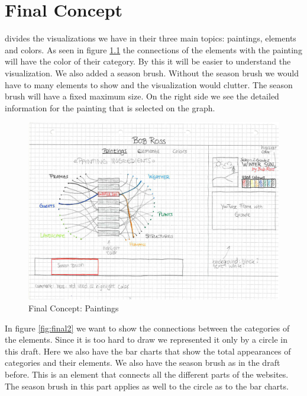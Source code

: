 \documentclass[a4paper]{tufte-book}
\begin{document}
\chapter{Final Concept}

 divides the visualizations we have in their three main topics: paintings, elements and colors. As seen in figure \ref{fig:final1} the connections of the elements with the painting will have the color of their category. By this it will be easier to understand the visualization. We also added a season brush. Without the season brush we would have to many elements to show and the visualization would clutter. The season brush will have a fixed maximum size. On the right side we see the detailed information for the painting that is selected on the graph. \\

\begin{figure}
	\includegraphics{Images/final_concept_draft_1.jpg}
	\caption{Final Concept: Paintings}
	\label{fig:final1}
\end{figure}

In figure \ref{fig:final2} we want to show the connections between the categories of the elements. Since it is too hard to draw we represented it only by a circle in this draft. Here we also have the bar charts that show the total appearances of categories and their elements. We also have the season brush as in the draft before. This is an element that connects all the different parts of the websites. The season brush in this part applies as well to the circle as to the bar charts.\\
\end{document}
